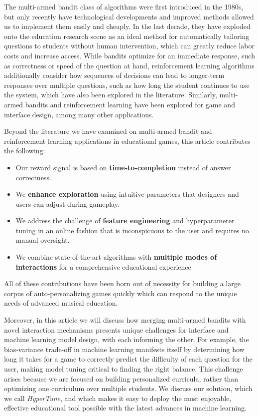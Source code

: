 \documentclass[manuscript, nonacm]{acmart_no_footer}
\begin{document}
The multi-armed bandit class of algorithms\cite{multi_armed_bandits1, multi_armed_bandits2} were first introduced in the 1980s, but only recently have technological developments and improved methods allowed us to implement them easily and cheaply. In the last decade, they have exploded onto the education research scene\cite{bandits_education_survey, bandits_education_axis, bandits_education_clement1, bandits_education_liu, bandits_education} as an ideal method for automatically tailoring questions to students without human intervention, which can greatly reduce labor costs and increase access. While bandits optimize for an immediate response, such as correctness or speed of the question at hand, reinforcement learning algorithms additionally consider how sequences of decisions can lead to longer-term responses over multiple questions, such as how long the student continues to use the system, which have also been explored in the literature\cite{rl_education_survey, rl_education_nips, rl_education_amazon}. Similarly, multi-armed bandits\cite{bandits_interface, bandits_games} and reinforcement learning\cite{rl_game, rl_game2} have been explored for game and interface design, among many other applications\cite{bandits_applications, rl_applications}.

Beyond the literature we have examined on multi-armed bandit and reinforcement learning applications in educational games, this article contributes the following: 
\begin{itemize}
\item Our reward signal is based on \textbf{time-to-completion} instead of answer correctness.
\item We \textbf{enhance exploration} using intuitive parameters that designers and users can adjust during gameplay.
\item We address the challenge of \textbf{feature engineering} and hyperparameter tuning in an online fashion that is inconspicuous to the user and requires no manual oversight.
\item We combine state-of-the-art algorithms with \textbf{multiple modes of interactions} for a comprehensive educational experience
\end{itemize}
All of these contributions have been born out of necessity for building a large corpus of auto-personalizing games quickly which can respond to the unique needs of advanced musical education. 

Moreover, in this article we will discuss how merging multi-armed bandits with novel interaction mechanisms presents unique challenges for interface and machine learning model design, with each informing the other. For example, the bias-variance trade-off\cite{bishop} in machine learning manifests itself by determining how long it takes for a game to correctly predict the difficulty of each question for the user, making model tuning critical to finding the right balance. This challenge arises because we are focused on building personalized curricula, rather than optimizing one curriculum over multiple students. We discuss our solution, which we call \textit{HyperTune}, and which makes it easy to deploy the most enjoyable, effective educational tool possible with the latest advances in machine learning.
\end{document}
